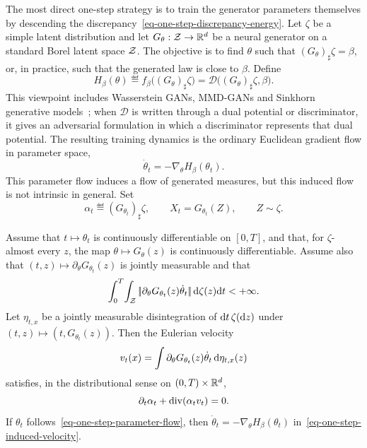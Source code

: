 The most direct one-step strategy is to train the generator parameters themselves by descending the discrepancy~\eqref{eq-one-step-discrepancy-energy}. Let $\zeta$ be a simple latent distribution and let $G_\theta:\mathcal{Z}\to\mathbb{R}^d$ be a neural generator on a standard Borel latent space $\mathcal{Z}$. The objective is to find $\theta$ such that $(G_\theta)_\sharp\zeta=\beta$, or, in practice, such that the generated law is close to $\beta$. Define
\begin{equation}\label{eq-one-step-parameter-discrepancy}
	H_\beta(\theta)
	\eqdef
	f_\beta\big((G_\theta)_\sharp\zeta\big)
	=
	\mathcal D\big((G_\theta)_\sharp\zeta,\beta\big).
\end{equation}
This viewpoint includes Wasserstein GANs, MMD-GANs and Sinkhorn generative models~\citep{WassersteinGAN,MMD-GAN,2017-Genevay-AutoDiff}; when $\mathcal D$ is written through a dual potential or discriminator, it gives an adversarial formulation in which a discriminator represents that dual potential. The resulting training dynamics is the ordinary Euclidean gradient flow in parameter space,
\begin{equation}\label{eq-one-step-parameter-flow}
	\dot\theta_t=-\nabla_\theta H_\beta(\theta_t).
\end{equation}
This parameter flow induces a flow of generated measures, but this induced flow is not intrinsic in general. Set
\[
	\alpha_t\eqdef(G_{\theta_t})_\sharp\zeta,
	\qquad
	X_t=G_{\theta_t}(Z),
	\qquad
	Z\sim\zeta.
\]
\begin{prop}\label{prop-parameter-path-continuity}
	Assume that $t\mapsto\theta_t$ is continuously differentiable on $[0,T]$, and that, for $\zeta$-almost every $z$, the map $\theta\mapsto G_\theta(z)$ is continuously differentiable. Assume also that $(t,z)\mapsto\partial_\theta G_{\theta_t}(z)$ is jointly measurable and that
	\[
		\int_0^T\!\int_{\mathcal{Z}}
		|\!| \partial_\theta G_{\theta_t}(z)\dot\theta_t |\!|
		\,\mathrm{d}\zeta(z)\mathrm{d} t<+\infty.
	\]
	Let $\eta_{t,x}$ be a jointly measurable disintegration of $\mathrm{d} t\,\zeta(\mathrm{d} z)$ under $(t,z)\mapsto(t,G_{\theta_t}(z))$. Then the Eulerian velocity
	\begin{equation}\label{eq-one-step-induced-velocity}
		v_t(x)=\int \partial_\theta G_{\theta_t}(z)\dot\theta_t\,\mathrm{d}\eta_{t,x}(z)
	\end{equation}
		satisfies, in the distributional sense on $(0,T)\times\mathbb{R}^d$,
	\begin{equation}\label{eq-one-step-induced-continuity}
		\partial_t\alpha_t+\operatorname{div}(\alpha_t v_t)=0.
	\end{equation}
	If $\theta_t$ follows~\eqref{eq-one-step-parameter-flow}, then $\dot\theta_t=-\nabla_\theta H_\beta(\theta_t)$ in~\eqref{eq-one-step-induced-velocity}.
\end{prop}


